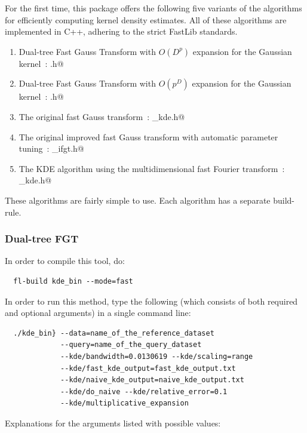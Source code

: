 \documentclass[letter]{report}
\begin{document}
For the first time, this package offers the following five variants of
the algorithms for efficiently computing kernel density estimates. All
of these algorithms are implemented in C++, adhering to the strict
FastLib standards.

\begin{enumerate}
\item{Dual-tree Fast Gauss Transform with $O(D^p)$ expansion for the
Gaussian kernel~\cite{LEE06}: \verb@kde.h@}
\item{Dual-tree Fast Gauss Transform with $O(p^D)$ expansion for the
Gaussian kernel~\cite{LEE05}: \verb@kde.h@}
\item{The original fast Gauss transform~\cite{ggstrain}: \verb@fgt_kde.h@}
\item{The original improved fast Gauss transform with automatic
parameter tuning~\cite{YANG03}: \verb@original_ifgt.h@}
\item{The KDE algorithm using the multidimensional fast Fourier
transform~\cite{wand94}: \verb@fft_kde.h@}
\end{enumerate}

These algorithms are fairly simple to use. Each algorithm has a
separate build-rule.
\subsubsection{Dual-tree FGT}
In order to compile this tool, do: 
\begin{verbatim}
  fl-build kde_bin --mode=fast
\end{verbatim}

In order to run this method, type the following (which consists of
both required and optional arguments) in a single command line:
\begin{verbatim}
  ./kde_bin} --data=name_of_the_reference_dataset
             --query=name_of_the_query_dataset
             --kde/bandwidth=0.0130619 --kde/scaling=range
             --kde/fast_kde_output=fast_kde_output.txt
             --kde/naive_kde_output=naive_kde_output.txt
             --kde/do_naive --kde/relative_error=0.1
             --kde/multiplicative_expansion
\end{verbatim}

Explanations for the arguments listed with possible values:
\end{document}
